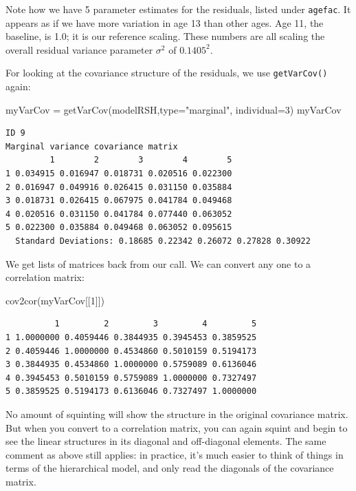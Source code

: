 \documentclass[
  letterpaper,
  DIV=11,
  numbers=noendperiod]{scrreprt}
\newenvironment{Shaded}{}{}
\newcommand{\AttributeTok}[1]{\textcolor[rgb]{0.49,0.56,0.16}{#1}}
\newcommand{\DecValTok}[1]{\textcolor[rgb]{0.25,0.63,0.44}{#1}}
\newcommand{\FunctionTok}[1]{\textcolor[rgb]{0.02,0.16,0.49}{#1}}
\newcommand{\NormalTok}[1]{#1}
\newcommand{\OtherTok}[1]{\textcolor[rgb]{0.00,0.44,0.13}{#1}}
\newcommand{\StringTok}[1]{\textcolor[rgb]{0.25,0.44,0.63}{#1}}
\begin{document}
Note how we have 5 parameter estimates for the residuals, listed under
\texttt{agefac}. It appears as if we have more variation in age 13 than
other ages. Age 11, the baseline, is 1.0; it is our reference scaling.
These numbers are all scaling the overall residual variance parameter
\(\sigma^2\) of \(0.1405^2\).

For looking at the covariance structure of the residuals, we use
\texttt{getVarCov()} again:

\begin{Shaded}
\begin{Highlighting}[]
\NormalTok{myVarCov }\OtherTok{=} \FunctionTok{getVarCov}\NormalTok{(modelRSH,}\AttributeTok{type=}\StringTok{"marginal"}\NormalTok{, }\AttributeTok{individual=}\DecValTok{3}\NormalTok{)}
\NormalTok{myVarCov}
\end{Highlighting}
\end{Shaded}

\begin{verbatim}
ID 9 
Marginal variance covariance matrix
         1        2        3        4        5
1 0.034915 0.016947 0.018731 0.020516 0.022300
2 0.016947 0.049916 0.026415 0.031150 0.035884
3 0.018731 0.026415 0.067975 0.041784 0.049468
4 0.020516 0.031150 0.041784 0.077440 0.063052
5 0.022300 0.035884 0.049468 0.063052 0.095615
  Standard Deviations: 0.18685 0.22342 0.26072 0.27828 0.30922 
\end{verbatim}

We get lists of matrices back from our call. We can convert any one to a
correlation matrix:

\begin{Shaded}
\begin{Highlighting}[]
\FunctionTok{cov2cor}\NormalTok{(myVarCov[[}\DecValTok{1}\NormalTok{]])}
\end{Highlighting}
\end{Shaded}

\begin{verbatim}
          1         2         3         4         5
1 1.0000000 0.4059446 0.3844935 0.3945453 0.3859525
2 0.4059446 1.0000000 0.4534860 0.5010159 0.5194173
3 0.3844935 0.4534860 1.0000000 0.5759089 0.6136046
4 0.3945453 0.5010159 0.5759089 1.0000000 0.7327497
5 0.3859525 0.5194173 0.6136046 0.7327497 1.0000000
\end{verbatim}

No amount of squinting will show the structure in the original
covariance matrix. But when you convert to a correlation matrix, you can
again squint and begin to see the linear structures in its diagonal and
off-diagonal elements. The same comment as above still applies: in
practice, it's much easier to think of things in terms of the
hierarchical model, and only read the diagonals of the covariance
matrix.
\end{document}
